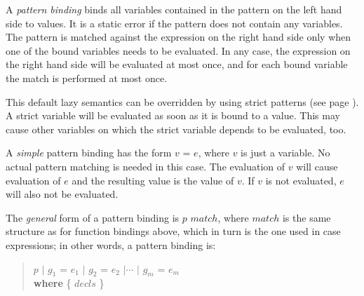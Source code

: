 A \emph{pattern binding} binds all variables contained in the pattern on the left hand side to values. It is a static error if the pattern does not contain any variables. The pattern is matched against the expression on the right hand side only when one of the bound variables needs to be evaluated. In any case, the expression on the right hand side will be evaluated at most once, and for each bound variable the match is performed at most once.

This default lazy semantics can be overridden by using strict patterns (see page \pageref{strict pattern}). A strict variable will be evaluated as soon as it is bound to a value. This may cause other variables on which the strict variable depends to be evaluated, too.

A \emph{simple} pattern binding has the form $v$ = $e$, where $v$ is just a variable. No actual pattern matching is needed in this case. The evaluation of $v$ will cause evaluation of $e$ and the resulting value is the value of $v$. If $v$ is not evaluated, $e$ will also not be evaluated.

The \emph{general} form of a pattern binding is $p$ $match$, where $match$ is the same structure as for function bindings above, which in turn is the one used in case expressions; in other words, a pattern binding is:
\begin{quote}
\begin{flushleft}
$p$ $|$ $g_1$ = $e_1$ $|$ $g_2$ = $e_2$ $|\cdots$ $|$ $g_m$ = $e_m$\\
\hspace{0.3cm}\textbf{where} \{ $decls$ \}
\end{flushleft}
\end{quote}

